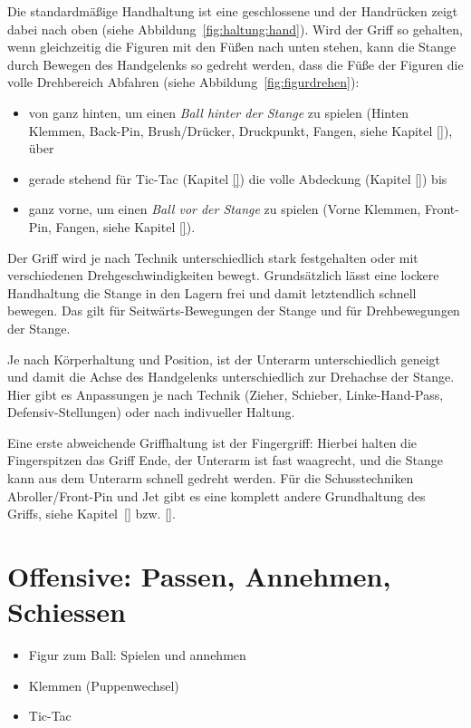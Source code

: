 Die standardmäßige Handhaltung ist eine geschlossene
und der Handrücken zeigt dabei nach oben (siehe Abbildung~\ref{fig:haltung:hand}).
Wird der Griff so gehalten, wenn gleichzeitig die Figuren mit den Füßen nach unten stehen, kann die Stange durch Bewegen des Handgelenks so gedreht werden, dass die Füße der Figuren die volle Drehbereich Abfahren (siehe Abbildung~\ref{fig:figurdrehen}):
\begin{itemize}
    \item von ganz hinten, um einen \textit{Ball hinter der Stange} zu spielen (Hinten Klemmen, Back-Pin, Brush/Drücker, Druckpunkt, Fangen, siehe Kapitel \ref{}), über
    \item gerade stehend für Tic-Tac (Kapitel \ref{}) die volle Abdeckung (Kapitel \ref{}) bis 
    \item ganz vorne, um einen \textit{Ball vor der Stange} zu spielen (Vorne Klemmen, Front-Pin, Fangen, siehe Kapitel \ref{}).
\end{itemize}

Der Griff wird je nach Technik unterschiedlich stark festgehalten oder mit verschiedenen Drehgeschwindigkeiten bewegt. 
Grundsätzlich lässt  eine lockere Handhaltung die Stange in den Lagern frei und damit letztendlich schnell bewegen.
Das gilt für Seitwärts-Bewegungen der Stange und für Drehbewegungen der Stange.

Je nach Körperhaltung und Position, ist der Unterarm unterschiedlich geneigt und damit die Achse des Handgelenks unterschiedlich zur Drehachse der Stange.
Hier gibt es Anpassungen je nach Technik (Zieher, Schieber, Linke-Hand-Pass, Defensiv-Stellungen) oder nach indivueller Haltung.

Eine erste abweichende Griffhaltung ist der Fingergriff: Hierbei halten die Fingerspitzen das Griff Ende, der Unterarm ist fast waagrecht, und die Stange kann aus dem Unterarm schnell gedreht werden.
Für die Schusstechniken Abroller/Front-Pin und Jet gibt es eine komplett andere Grundhaltung des Griffs, siehe Kapitel~\ref{} bzw. \ref{}.


\section{Offensive: Passen, Annehmen, Schiessen}
\label{technik:offensive}

\begin{itemize}
\item Figur zum Ball: Spielen und annehmen
\item Klemmen (Puppenwechsel)
\item Tic-Tac
\end{itemize}


